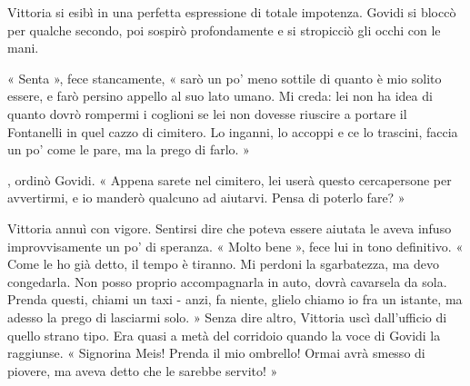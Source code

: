 Vittoria si esibì in una perfetta espressione di totale impotenza. Govidi si bloccò per qualche secondo, poi sospirò profondamente e si stropicciò gli occhi con le mani.

« Senta », fece stancamente, « sarò un po' meno sottile di quanto è mio solito essere, e farò persino appello al suo lato umano. Mi creda: lei non ha idea di quanto dovrò rompermi i coglioni se lei non dovesse riuscire a portare il Fontanelli in quel cazzo di cimitero. Lo inganni, lo accoppi e ce lo trascini, faccia un po' come le pare, ma la prego di farlo. »

, ordinò Govidi. « Appena sarete nel cimitero, lei userà questo cercapersone per avvertirmi, e io manderò qualcuno ad aiutarvi. Pensa di poterlo fare? »

Vittoria annuì con vigore. Sentirsi dire che poteva essere aiutata le aveva infuso improvvisamente un po' di speranza.
« Molto bene », fece lui in tono definitivo. « Come le ho già detto, il tempo è tiranno. Mi perdoni la sgarbatezza, ma devo congedarla. Non posso proprio accompagnarla in auto, dovrà cavarsela da sola. Prenda questi, chiami un taxi - anzi, fa niente, glielo chiamo io fra un istante, ma adesso la prego di lasciarmi solo. »
Senza dire altro, Vittoria uscì dall'ufficio di quello strano tipo.
Era quasi a metà del corridoio quando la voce di Govidi la raggiunse. « Signorina Meis! Prenda il mio ombrello! Ormai avrà smesso di piovere, ma aveva detto che le sarebbe servito! »